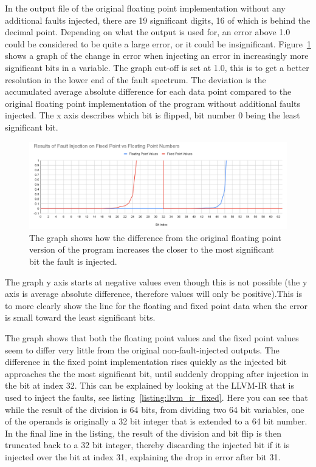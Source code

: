 In the output file of the original floating point implementation without any additional faults injected, there are 19 significant digits, 16 of which is behind the decimal point. Depending on what the output is used for, an error above 1.0 could be considered to be quite a large error, or it could be insignificant. Figure~\ref{fig:graph_fixed_vs_float_error} shows a graph of the change in error when injecting an error in increasingly more significant bits in a variable. The graph cut-off is set at 1.0, this is to get a better resolution in the lower end of the fault spectrum. The deviation is the accumulated average absolute difference for each data point compared to the original floating point implementation of the program without additional faults injected. The x axis describes which bit is flipped, bit number 0 being the least significant bit.

\begin{figure}[h!]
    \centering
    \includegraphics[width=0.5\linewidth]{Images/graph_float_vs_fixed_fault_injection_results.png}
    \caption{The graph shows how the difference from the original floating point version of the program increases the closer to the most significant bit the fault is injected. }
    \label{fig:graph_fixed_vs_float_error}
\end{figure}


The graph y axis starts at negative values even though this is not possible (the y axis is average absolute difference, therefore values will only be positive).This is to more clearly show the line for the floating and fixed point data when the error is small toward the least significant bits.

The graph shows that both the floating point values and the fixed point values seem to differ very little from the original non-fault-injected outputs. The difference in the fixed point implementation rises quickly as the injected bit approaches the the most significant bit, until suddenly dropping after injection in the bit at index 32. This can be explained by looking at the LLVM-IR that is used to inject the faults, see listing~\ref{listing:llvm_ir_fixed}. Here you can see that while the result of the division is 64 bits, from dividing two 64 bit variables, one of the operands is originally a 32 bit integer that is extended to a 64 bit number. In the final line in the listing, the result of the division and bit flip is then truncated back to a 32 bit integer, thereby discarding the injected bit if it is injected over the bit at index 31, explaining the drop in error after bit 31.

